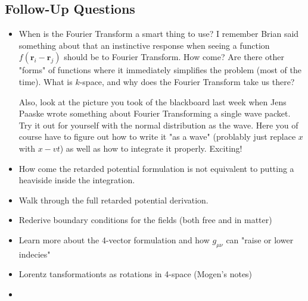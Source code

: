 \subsection*{Follow-Up Questions}
\begin{itemize}
    \item When is the Fourier Transform a smart thing to use? I remember Brian said something about that an instinctive response when seeing a function \(f(\mathbf{r}_i - \mathbf{r}_j)\) should be to Fourier Transform. How come? Are there other "forms" of functions where it immediately simplifies the problem (most of the time). What is \(k\)-space, and why does the Fourier Transform take us there? 
    
    Also, look at the picture you took of the blackboard last week when Jens Paaske wrote something about Fourier Transforming a single wave packet. Try it out for yourself with the normal distribution as the wave. Here you of course have to figure out how to write it "as a wave" (problably just replace \(x\) with \(x - vt\)) as well as how to integrate it properly. Exciting!
    \item How come the retarded potential formulation is not equivalent to putting a heaviside inside the integration.
    \item Walk through the full retarded potential derivation.
    \item Rederive boundary conditions for the fields (both free and in matter)
    \item Learn more about the 4-vector formulation and how \(g_{\mu \nu}\) can "raise or lower indecies"
    \item Lorentz tansformationts as rotations in 4-space (Mogen's notes)
    \item {}
\end{itemize}
